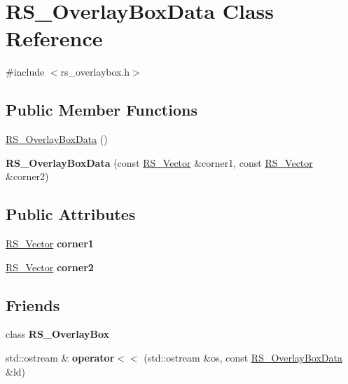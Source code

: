 \hypertarget{classRS__OverlayBoxData}{\section{R\-S\-\_\-\-Overlay\-Box\-Data Class Reference}
\label{classRS__OverlayBoxData}
}


{\ttfamily \#include $<$rs\-\_\-overlaybox.\-h$>$}

\subsection*{Public Member Functions}
\begin{DoxyCompactItemize}
\item 
\hyperlink{classRS__OverlayBoxData_a0de4d5b0895e73c365e485a1c9b99389}{R\-S\-\_\-\-Overlay\-Box\-Data} ()
\item 
\hypertarget{classRS__OverlayBoxData_ab8744c6215210aa738d8a86634e9d5c5}{{\bfseries R\-S\-\_\-\-Overlay\-Box\-Data} (const \hyperlink{classRS__Vector}{R\-S\-\_\-\-Vector} \&corner1, const \hyperlink{classRS__Vector}{R\-S\-\_\-\-Vector} \&corner2)}\label{classRS__OverlayBoxData_ab8744c6215210aa738d8a86634e9d5c5}

\end{DoxyCompactItemize}
\subsection*{Public Attributes}
\begin{DoxyCompactItemize}
\item 
\hypertarget{classRS__OverlayBoxData_a610bb11ac062b91a43c1d846cdf54f12}{\hyperlink{classRS__Vector}{R\-S\-\_\-\-Vector} {\bfseries corner1}}\label{classRS__OverlayBoxData_a610bb11ac062b91a43c1d846cdf54f12}

\item 
\hypertarget{classRS__OverlayBoxData_a8865a02d921e840b6352a1fbb753a40f}{\hyperlink{classRS__Vector}{R\-S\-\_\-\-Vector} {\bfseries corner2}}\label{classRS__OverlayBoxData_a8865a02d921e840b6352a1fbb753a40f}

\end{DoxyCompactItemize}
\subsection*{Friends}
\begin{DoxyCompactItemize}
\item 
\hypertarget{classRS__OverlayBoxData_a2cc2b28706f00fe11b09ea9c8177c9c9}{class {\bfseries R\-S\-\_\-\-Overlay\-Box}}\label{classRS__OverlayBoxData_a2cc2b28706f00fe11b09ea9c8177c9c9}

\item 
\hypertarget{classRS__OverlayBoxData_a4e5ae9dc4a3854a69b42eba3903a4b4d}{std\-::ostream \& {\bfseries operator$<$$<$} (std\-::ostream \&os, const \hyperlink{classRS__OverlayBoxData}{R\-S\-\_\-\-Overlay\-Box\-Data} \&ld)}\label{classRS__OverlayBoxData_a4e5ae9dc4a3854a69b42eba3903a4b4d}

\end{DoxyCompactItemize}


